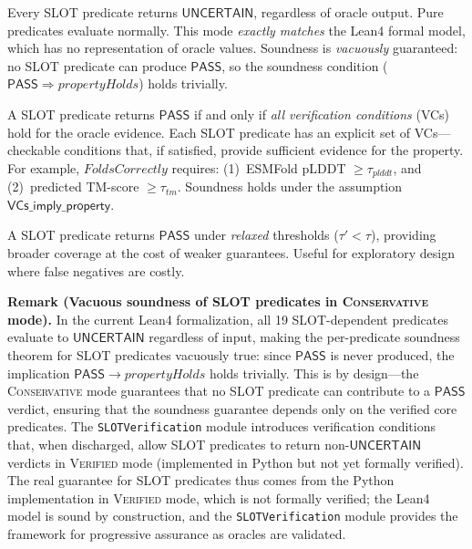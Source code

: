 \documentclass[acmsmall,review,anonymous]{acmart}
\newcommand{\PASS}{\ensuremath{\mathsf{PASS}}\xspace}
\newcommand{\UNCERTAIN}{\ensuremath{\mathsf{UNCERTAIN}}\xspace}
\newcommand{\CONSERVATIVE}{\textsc{Conservative}\xspace}
\newcommand{\VERIFIED}{\textsc{Verified}\xspace}
\newcommand{\PERMISSIVE}{\textsc{Permissive}\xspace}
\begin{document}
\begin{description}[leftmargin=!,labelwidth=2.2cm,itemsep=3pt,topsep=2pt]
\item[\CONSERVATIVE:]
Every SLOT predicate returns \UNCERTAIN, regardless of oracle output.
Pure predicates evaluate normally.
This mode \emph{exactly matches} the Lean4 formal model, which has no
representation of oracle values.
Soundness is \emph{vacuously} guaranteed: no SLOT predicate can produce
\PASS, so the soundness condition
($\PASS \Rightarrow \mathit{propertyHolds}$) holds trivially.

\item[\VERIFIED:]
A SLOT predicate returns \PASS{} if and only if \emph{all verification
conditions} (VCs) hold for the oracle evidence.
Each SLOT predicate has an explicit set of VCs---checkable conditions
that, if satisfied, provide sufficient evidence for the property.
For example, $\mathit{FoldsCorrectly}$ requires:
(1)~ESMFold pLDDT $\ge \tau_{\mathit{plddt}}$, and
(2)~predicted TM-score $\ge \tau_{\mathit{tm}}$.
Soundness holds under the assumption
$\textsf{VCs\_imply\_property}$.

\item[\PERMISSIVE:]
A SLOT predicate returns \PASS{} under \emph{relaxed} thresholds
($\tau' < \tau$), providing broader coverage at the cost of weaker
guarantees.
Useful for exploratory design where false negatives are costly.
\end{description}

\noindent\textbf{Remark (Vacuous soundness of SLOT predicates in \CONSERVATIVE{} mode).}
In the current Lean4 formalization, all 19 SLOT-dependent predicates
evaluate to \UNCERTAIN{} regardless of input, making the per-predicate
soundness theorem for SLOT predicates vacuously true: since \PASS{} is
never produced, the implication $\PASS \to \mathit{propertyHolds}$ holds
trivially. This is by design---the \CONSERVATIVE{} mode guarantees that
no SLOT predicate can contribute to a \PASS{} verdict, ensuring that the
soundness guarantee depends only on the verified core predicates. The
\texttt{SLOTVerification} module introduces verification conditions that,
when discharged, allow SLOT predicates to return non-\UNCERTAIN{} verdicts
in \VERIFIED{} mode (implemented in Python but not yet formally verified).
The real guarantee for SLOT predicates thus comes from the Python
implementation in \VERIFIED{} mode, which is not formally verified; the
Lean4 model is sound by construction, and the \texttt{SLOTVerification}
module provides the framework for progressive assurance as oracles are
validated.
\end{document}
